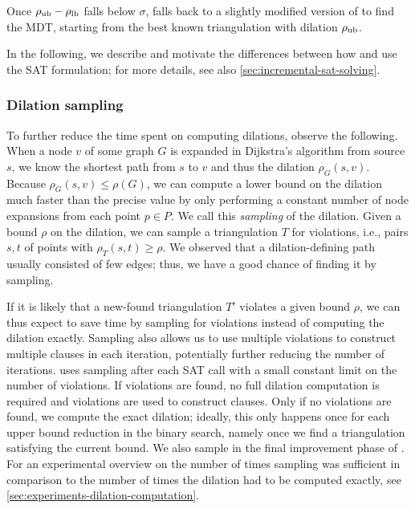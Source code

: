 Once $\rho_{\text{ub}}-\rho_{\text{lb}}$ falls below $\sigma$, \binmdt{} falls back to a slightly modified version of \incmdt{} to find the MDT,
starting from the best known triangulation with dilation $\rho_{\text{ub}}$.

In the following, we describe and motivate the differences between how \incmdt{} and \binmdt{} use the SAT formulation;
for more details, see also \cref{sec:incremental-sat-solving}.

\subsubsection{Dilation sampling}
To further reduce the time spent on computing dilations, observe the following.
When a node $v$ of some graph $G$ is expanded in Dijkstra's algorithm from source $s$, we know the shortest path from $s$ to $v$ and thus the dilation $\rho_G(s,v)$.
Because $\rho_G(s,v) \leq \rho(G)$, we can compute a lower bound on the dilation much faster than the precise value by only performing a constant number of node expansions from each point $p \in P$.
We call this \emph{sampling} of the dilation.
Given a bound $\rho$ on the dilation, we can sample a triangulation $T$ for violations, i.e., pairs $s,t$ of points with $\rho_T(s,t) \geq \rho$.
We observed that a dilation-defining path usually consisted of few edges;
thus, we have a good chance of finding it by sampling.

If it is likely that a new-found triangulation $T'$ violates a given bound $\rho$,
we can thus expect to save time by sampling for violations instead of computing the dilation exactly.
Sampling also allows us to use multiple violations to construct multiple clauses in each iteration,
potentially further reducing the number of iterations.
\binmdt{} uses sampling after each SAT call with a small constant limit on the number of violations.
If violations are found, no full dilation computation is required and violations are used to construct clauses.
Only if no violations are found, we compute the exact dilation;
ideally, this only happens once for each upper bound reduction in the binary search,
namely once we find a triangulation satisfying the current bound.
We also sample in the final improvement phase of \binmdt{}.
For an experimental overview on the number of times sampling was sufficient in comparison to the 
number of times the dilation had to be computed exactly, see \cref{sec:experiments-dilation-computation}.
